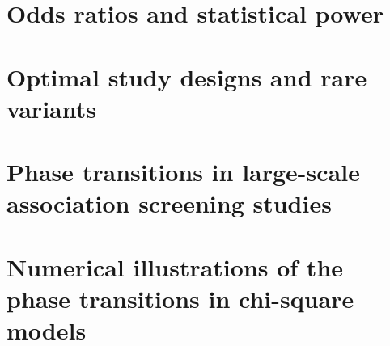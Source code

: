 \section{Odds ratios and statistical power}
\label{sec:odds-and-power}



\section{Optimal study designs and rare variants}
\label{sec:optimal-design} 



\section{Phase transitions in large-scale association screening studies}
\label{sec:phase-transitions-in-GWAS}



\section{Numerical illustrations of the phase transitions in chi-square models}
\label{sec:numerical}



%
